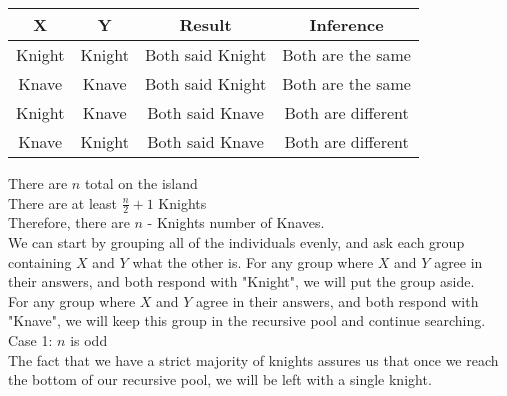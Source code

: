 \documentclass{article}
\begin{document}
\begin{enumerate}
\begin{table}[h!]
\centering
\begin{tabular}{|c|c|c|c|}
\hline
\textbf{X} & \textbf{Y} & \textbf{Result} & \textbf{Inference} \\ 
\hline
Knight & Knight & Both said Knight & Both are the same \\ 
\hline
Knave & Knave & Both said Knight & Both are the same \\ 
\hline
Knight & Knave & Both said Knave & Both are different \\ 
\hline
Knave & Knight & Both said Knave & Both are different \\ 
\hline
\end{tabular}
\end{table}
There are $n$ total on the island \\
There are at least $\frac{n}{2}+1$ Knights \\
Therefore, there are $n$ - Knights number of Knaves. \\
\newline 
We can start by grouping all of the individuals evenly, and ask each group containing $X$ and $Y$ what the other is. For any group where $X$ and $Y$ agree in their answers, and both respond with "Knight", we will put the group aside. \\ 
For any group where $X$ and $Y$ agree in their answers, and both respond with "Knave", we will keep this group in the recursive pool and continue searching.
\newpage 
Case 1: $n$ is odd \\
The fact that we have a strict majority of knights assures us that once we reach the bottom of our recursive pool, we will be left with a single knight. \\

\end{enumerate}
\end{document}
